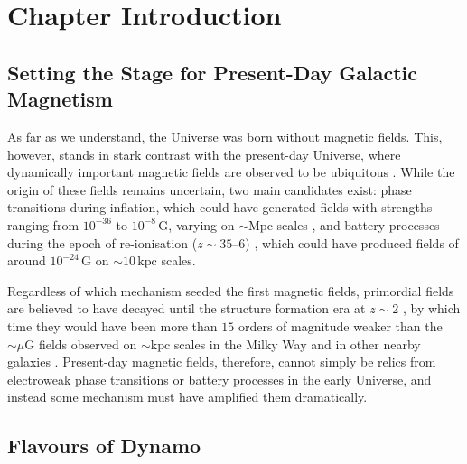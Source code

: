 \documentclass[12pt,twoside]{extreport}
\newcommand{\eg}{e.g.,\xspace} %
\begin{document}
\section{Chapter Introduction}

\subsection{Setting the Stage for Present-Day Galactic Magnetism}

As far as we understand, the Universe was born without magnetic fields. This, however, stands in stark contrast with the present-day Universe, where dynamically important magnetic fields are observed to be ubiquitous \citep[see][for recent reviews on magnetic fields in galaxies and their impact on star formation]{krumholz2019role, brandenburg2023galactic}. While the origin of these fields remains uncertain, two main candidates exist: phase transitions during inflation, which could have generated fields with strengths ranging from $10^{-36}$ to $10^{-8} \,\mathrm{G}$, varying on $\sim \mathrm{Mpc}$ scales \citep{quashnock1989magnetic, sigl1997primordial, kahniashvili2013evolution}, and battery processes during the epoch of re-ionisation ($z \sim 35$--$6$) \citep{biermann1950ursprung, naoz2013generation}, which could have produced fields of around $10^{-24} \,\mathrm{G}$ on $\sim 10 \,\mathrm{kpc}$ scales.

Regardless of which mechanism seeded the first magnetic fields, primordial fields are believed to have decayed until the structure formation era at $z \sim 2$ \citep[\eg][]{brandenburg2017evolution, vachaspati2021progress, hosking2022cosmic, mtchedlidze2022evolution, mtchedlidze2023inflationary, Hosking2023_cosmic_voids_nature}, by which time they would have been more than $15$ orders of magnitude weaker than the $\sim \mu\mathrm{G}$ fields observed on $\sim \mathrm{kpc}$ scales in the Milky Way and in other nearby galaxies \citep[\eg][]{kulsrud1997protogalactic, beck2019synthesizing, shah2021magnetic, lopez2022extragalactic}. Present-day magnetic fields, therefore, cannot simply be relics from electroweak phase transitions or battery processes in the early Universe, and instead some mechanism must have amplified them dramatically.

\subsection{Flavours of Dynamo}
\end{document}

